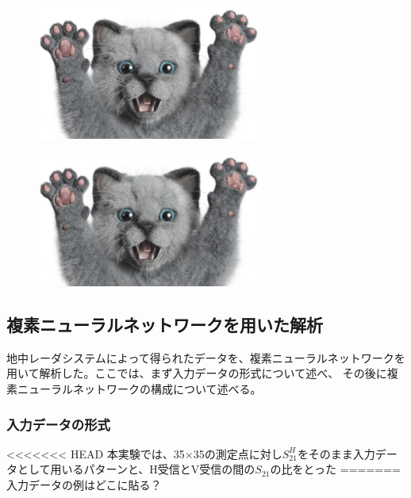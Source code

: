 \documentclass[11pt,a4paper,uplatex]{ujarticle}
\begin{document}
  \begin{figure}[tbp]
    \begin{minipage}[b]{0.495\textwidth}
      \centering
      \includegraphics[keepaspectratio, width=75mm]{Images/sampleneko.png}
      \label{fig:center_offset}
    \end{minipage}
    \begin{minipage}[b]{0.495\textwidth}
      \centering
      \includegraphics[keepaspectratio, width=75mm]{Images/sampleneko.png}
      \label{fig:actual_msr_range}
    \end{minipage}
  \end{figure}


  \subsection{複素ニューラルネットワークを用いた解析}\label{sec:analysis}
  地中レーダシステムによって得られたデータを、複素ニューラルネットワークを用いて解析した。ここでは、まず入力データの形式について述べ、
  その後に複素ニューラルネットワークの構成について述べる。
  \subsubsection{入力データの形式}
<<<<<<< HEAD
  本実験では、35×35の測定点に対し$S_{21}^{H}$をそのまま入力データとして用いるパターンと、H受信とV受信の間の$S_{21}$の比をとった
=======
  入力データの例はどこに貼る？
\end{document}
